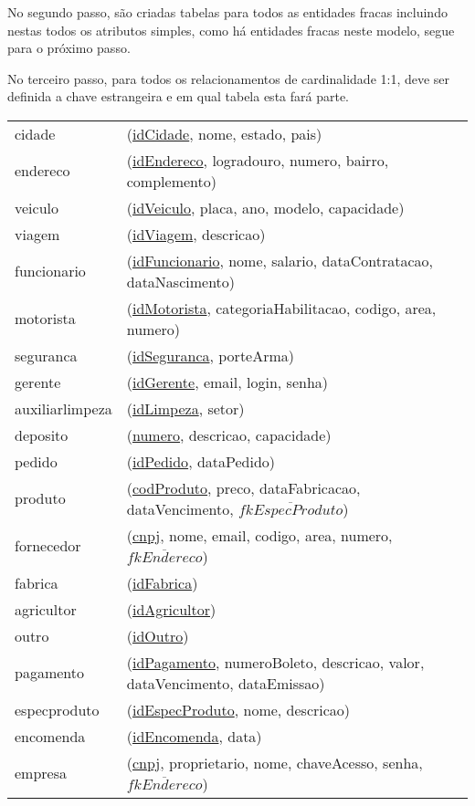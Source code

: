 \documentclass[12pt, onecolumn, titlepage]{article}
\begin{document}
No segundo passo, são criadas tabelas para todos as entidades fracas incluindo nestas todos os atributos simples, como há entidades fracas neste modelo, segue para o próximo passo.

No terceiro passo, para todos os relacionamentos de cardinalidade 1:1, deve ser definida a chave estrangeira e em qual tabela esta fará parte.

\begin{table}[htb!]
\begin{center}
\begin{tabular}{p{2.5cm} p{10.5cm}}
cidade & (\underline{idCidade}, nome, estado, pais) \\
endereco & (\underline{idEndereco}, logradouro, numero, bairro, complemento) \\
veiculo & (\underline{idVeiculo}, placa, ano, modelo, capacidade) \\
viagem & (\underline{idViagem}, descricao) \\
funcionario & (\underline{idFuncionario}, nome, salario, dataContratacao, dataNascimento)\\
motorista & (\underline{idMotorista}, categoriaHabilitacao, codigo, area, numero)\\
seguranca & (\underline{idSeguranca}, porteArma)\\
gerente & (\underline{idGerente}, email, login, senha)\\
auxiliarlimpeza & (\underline{idLimpeza}, setor)\\
deposito & (\underline{numero}, descricao, capacidade)\\
pedido & (\underline{idPedido}, dataPedido)\\
produto & (\underline{codProduto}, preco, dataFabricacao, dataVencimento, $\overline{fkEspecProduto}$)\\
fornecedor & (\underline{cnpj}, nome, email, codigo, area, numero, $\overline{fkEndereco}$)\\
fabrica & (\underline{idFabrica})\\
agricultor & (\underline{idAgricultor})\\
outro & (\underline{idOutro})\\
pagamento & (\underline{idPagamento}, numeroBoleto, descricao, valor, dataVencimento, dataEmissao)\\
especproduto & (\underline{idEspecProduto}, nome, descricao)\\
encomenda & (\underline{idEncomenda}, data)\\
empresa & (\underline{cnpj}, proprietario, nome, chaveAcesso, senha, $\overline{fkEndereco}$)
\end{tabular}
\end{center}
\end{table}
\end{document}
